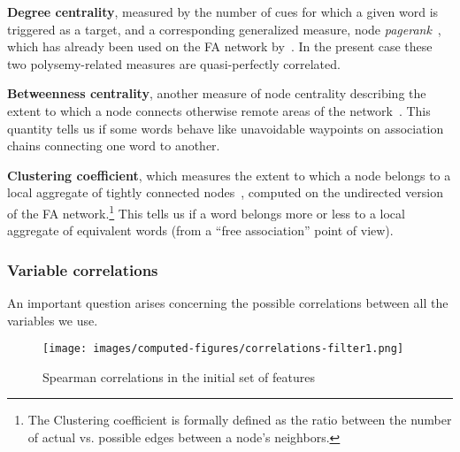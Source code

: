 \begin{APAitemize}
    \item \textbf{Degree centrality}, measured by the number of cues for which a given word is triggered as a target, and a corresponding generalized measure, node \emph{pagerank}~\citep{Page99}, which has already been used on the FA network by~\citet{Griffiths07}.
    In the present case these two polysemy-related measures are quasi-perfectly correlated. %
    \item \textbf{Betweenness centrality}, another measure of node centrality describing the extent to which a node connects otherwise remote areas of the network~\citep{free:set}.
    This quantity tells us if some words behave like unavoidable waypoints on association chains connecting one word to another.
    \item \textbf{Clustering coefficient}, which measures the extent to which a node belongs to a local aggregate of tightly connected nodes~\cite{watt-coll}, computed on the undirected version of the FA network.\footnote{The Clustering coefficient is formally defined as the ratio between the number of actual vs. possible edges between a node's neighbors.}
    This tells us if a word belongs more or less to a local aggregate of equivalent words (from a ``free association'' point of view).
\end{APAitemize}

\subsubsection{Variable correlations}

An important question arises concerning the possible correlations between all the variables we use.

\begin{figure}[!th]
    \centering
    \texttt{[image: images/computed-figures/correlations-filter1.png]}
    \caption{Spearman correlations in the initial set of features}
    \label{fig:feature-corrs-initial}
\end{figure}


